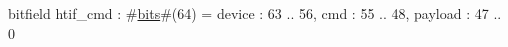 bitfield htif_cmd : #\hyperref[sailRISCVzbits]{bits}#(64) = {
  device  : 63 .. 56,
  cmd     : 55 .. 48,
  payload : 47 .. 0
}
